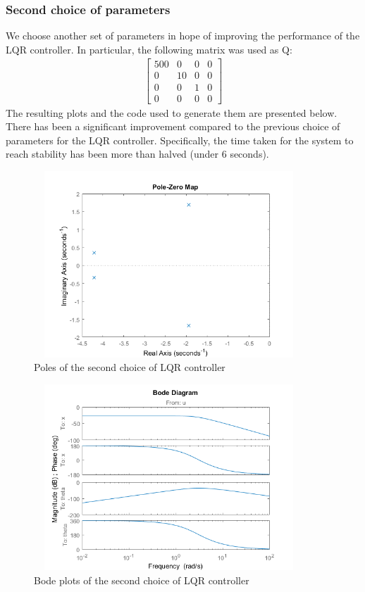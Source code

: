 \documentclass [12pt,letterpaper]{exam}
\begin{document}


\subsubsection{Second choice of parameters}
We choose another set of parameters in hope of improving the performance of the LQR controller. In particular, the following matrix was used as Q:
\begin{align}
\begin{bmatrix}
500 & 0 & 0 & 0 \\
0 & 10 & 0 & 0 \\
0 & 0 & 1 & 0 \\
0 & 0 & 0 & 0
\end{bmatrix}
\end{align}
The resulting plots and the code used to generate them are presented below. There has been a significant improvement compared to the previous choice of parameters for the LQR controller. Specifically, the time taken for the system to reach stability has been more than halved (under 6 seconds).

\begin{figure}[H]
  \centering
    \includegraphics[width=10.15cm, height=7cm]{lqr2_poles} 
  \caption{Poles of the second choice of LQR controller}
  \label{fig:lqr2_poles}
\end{figure}

\begin{figure}[H]
  \centering
    \includegraphics[width=10.15cm, height=7cm]{lqr2_bode} 
  \caption{Bode plots of the second choice of LQR controller}
  \label{fig:lqr2_bode}
\end{figure}
\end{document}
